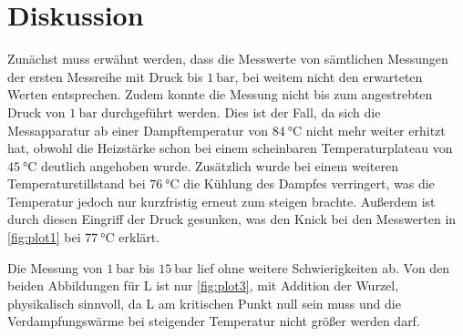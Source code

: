 \section{Diskussion}
\label{sec:Diskussion}
Zunächst muss erwähnt werden, dass die Messwerte von sämtlichen Messungen der ersten Messreihe mit Druck bis $\SI{1}{\bar}$, bei weitem nicht den erwarteten Werten entsprechen.
Zudem konnte die Messung nicht bis zum angestrebten Druck von $\SI{1}{\bar}$ durchgeführt werden. Dies ist der Fall, da sich die Messapparatur ab einer Dampftemperatur von
$\SI{84}{\celsius}$ nicht mehr weiter erhitzt hat, obwohl die Heizstärke schon bei einem scheinbaren Temperaturplateau von $\SI{45}{\celsius}$ deutlich angehoben wurde.
Zusätzlich wurde bei einem weiteren Temperaturstillstand bei $\SI{76}{\celsius}$ die Kühlung des Dampfes verringert, was die Temperatur jedoch nur kurzfristig erneut
zum steigen brachte. Außerdem ist durch diesen Eingriff der Druck gesunken, was den Knick bei den Messwerten in \autoref{fig:plot1} bei $\SI{77}{\celsius}$ erklärt.

\noindent
Die Messung von $\SI{1}{\bar}$ bis $\SI{15}{\bar}$ lief ohne weitere Schwierigkeiten ab. Von den beiden Abbildungen für L ist nur \autoref{fig:plot3}, mit Addition der
Wurzel, physikalisch sinnvoll, da L am kritischen Punkt null sein muss und die Verdampfungswärme bei steigender Temperatur nicht größer werden darf.